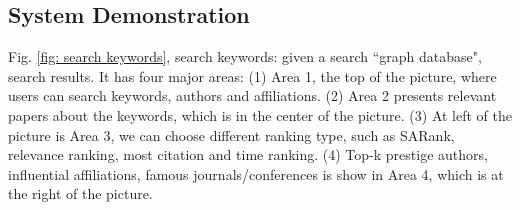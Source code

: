 \subsection{System Demonstration}
Fig. \ref{fig: search keywords}, search keywords: given a search ``graph database", search results. It has four major areas: (1) Area 1, the top of the picture, where users can search keywords, authors and affiliations. (2) Area 2 presents relevant papers about the keywords, which is in the center of the picture. (3) At left of the picture is Area 3, we can choose different ranking type, such as SARank, relevance ranking, most citation and time ranking. (4) Top-k prestige authors, influential affiliations, famous journals/conferences is show in Area 4, which is at the right of the picture.



